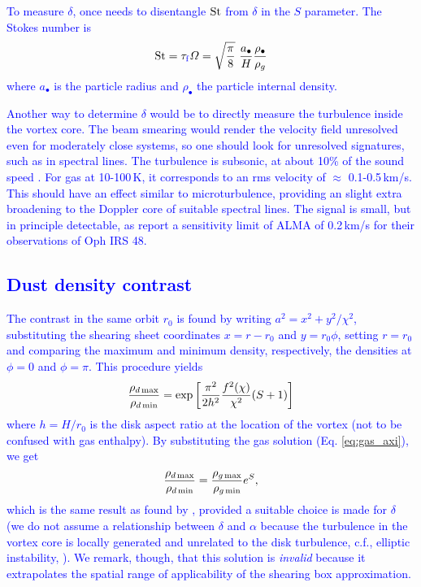 \documentclass[apj]{emulateapj}
\def\blue#1{\textcolor{blue}{ #1}}
\newcommand{\eqp}[1]{(Eq. \ref{#1})}
\newcommand{\beq}{\begin{equation}}
\newcommand{\eeq}{\end{equation}}
\newcommand{\tauf}{\tau_{\rm \blue{f}}}
\newcommand{\St}{{\rm St}}
\begin{document}
\blue{To measure $\delta$, once needs to disentangle $\St$ from $\delta$
  in the $S$ parameter. The Stokes number is 
\beq
    \St = \tauf  \varOmega = \sqrt{\frac{\pi}{8}} \ \frac{a_\bullet}{H}\frac{\rho_\bullet}{\rho_g}
\eeq
\noindent where $a_\bullet$ is the particle radius and $\rho_\bullet$ the
particle internal density.}

\blue{Another way to determine $\delta$ would be to directly measure the
turbulence inside the vortex core. The beam smearing would render the velocity
field unresolved even for moderately close systems, so 
one should look for unresolved signatures, such as in spectral
lines. The turbulence is subsonic, at about 10\% of the sound speed \citep{Lyra-Klahr11}. 
For gas at 10-100\,K, it corresponds to an rms velocity of $\approx$
0.1-0.5\,km/s. This should have an effect similar to microturbulence, providing an slight extra
broadening to the Doppler core of suitable spectral lines. The signal is
small, but in principle detectable, as \cite{vanderMarel13} report a
sensitivity limit of ALMA of 0.2\,km/s for their observations of
Oph IRS 48.} 

\blue{\subsection{Dust density contrast}}

\blue{The contrast in the same orbit $r_0$ is found by writing
  $a^2=x^2+y^2/\chi^2$, substituting the shearing sheet coordinates
  $x=r-r_0$ and $y=r_0 \phi$, setting $r=r_0$ and comparing the
  maximum and minimum density,  respectively, the densities at
  $\phi=0$ and $\phi=\pi$. This procedure yields
\beq
  \frac{\rho_{d\,{\rm max}}}{\rho_{d\,{\rm min}}} = \exp\left[\frac{\pi^2}{2h^2}\frac{f^2(\chi)}{\chi^2}(S+1)\right] 
\eeq 
\noindent where $h=H/r_0$ is the disk aspect ratio at the location of
the vortex (not to be confused with gas enthalpy). By substituting the
gas solution \eqp{eq:gas_axi}, we get \[\frac{\rho_{d\,{\rm
      max}}}{\rho_{d\,{\rm min}}} = \frac{\rho_{g\,{\rm
      max}}}{\rho_{g\,{\rm min}}} e^S,\] which is the same result
as found by \cite{Birnstiel13}, provided a suitable choice is made for
$\delta$ (we do not assume a relationship between $\delta$ and $\alpha$
because the turbulence in the vortex core is locally generated and
unrelated to the disk turbulence, c.f., elliptic instability,
\citealt{Lesur-Papaloizou10,Lyra-Klahr11}). We remark, though, that
this solution is {\it invalid} because it extrapolates the spatial
range of applicability of the shearing box approximation. } 
\end{document}
